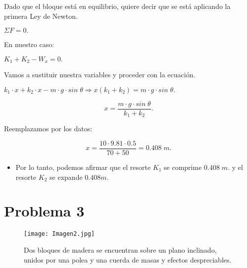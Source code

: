 \documentclass[a4paper,12pt]{article} %
\begin{document}
\begin{justify}
    Dado que el bloque está en equilibrio, quiere decir que se está aplicando la primera Ley de Newton.
\end{justify}

\begin{center}
    \(\Sigma F = 0.\)
\end{center}

\begin{justify}
    En nuestro caso:
\end{justify}

\begin{center}
    \(K_1 + K_2 - W_x = 0.\)
\end{center}
\begin{justify}
    Vamos a sustituir nuestra variables y proceder con la ecuación.
\end{justify}

\(k_1 \cdot x + k_2 \cdot x - m \cdot g \cdot sin\;\theta  \Longrightarrow x \left(k_1 + k_2\right) = m \cdot g \cdot sin \; \theta .\)

\begin{center}
    \[{x = \frac{ m \cdot g \cdot sin \; \theta }{k_1 + k_2}}.\]
\end{center}

\begin{justify}
    Reemplazamos por los datos:
\end{justify}

\begin{center}
    \[
    \boxed{x =\frac{10 \cdot 9.81 \cdot 0.5}{70+50} = 0.408 \; m. }
    \]
\end{center}

\begin{itemize}
    \item Por lo tanto, podemos afirmar que el resorte \(K_1\) se comprime \( 0.408 \; m.\) y el resorte \(K_2\) se expande \( 0.408 m.\)
\end{itemize}

\newpage

\newpage

\section*{Problema 3}
\begin{figure}[h!]
    \centering
    \texttt{[image: Imagen2.jpg]}
    \caption{Dos bloques de madera se encuentran sobre un plano inclinado, unidos por una polea y una cuerda de masas y efectos despreciables.}
\end{figure}
\end{document}
